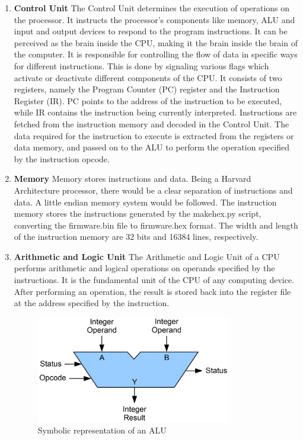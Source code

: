 \begin{enumerate}
\item \textbf{Control Unit} \newline
The Control Unit determines the execution of operations on the processor. It instructs the processor's components like memory, ALU and input and output devices to respond to the program instructions. It can be perceived as the brain inside the CPU, making it the brain inside the brain of the computer. It is responsible for controlling the flow of data in specific ways for different instructions. This is done by signaling various flags which activate or deactivate different components of the CPU. \newline\newline
It consists of two registers, namely the Program Counter (PC) register and the Instruction Register (IR). PC points to the address of the instruction to be executed, while IR contains the instruction being currently interpreted. Instructions are fetched from the instruction memory and decoded in the Control Unit. The data required for the instruction to execute is extracted from the registers or data memory, and passed on to the ALU to perform the operation specified by the instruction opcode.

\item \textbf{Memory} \newline
Memory stores instructions and data. Being a Harvard Architecture processor, there would be a clear separation of instructions and data. A little endian memory system would be followed. The instruction memory stores the instructions generated by the makehex.py script, converting the firmware.bin file to firmware.hex format. The width and length of the instruction memory are 32 bits and 16384 lines, respectively. 

\item \textbf{Arithmetic and Logic Unit} \newline
The Arithmetic and Logic Unit of a CPU performs arithmetic and logical operations on operands specified by the instructions. It is the fundamental unit of the CPU of any computing device. After performing an operation, the result is stored back into the register file at the address specified by the instruction.

\begin{figure}[h!]
\centering
\includegraphics[width=8.5cm]{figures/ALU_block.PNG}
\caption{Symbolic representation of an ALU}
\label{fig:riscv7}
\end{figure}
\end{enumerate}

